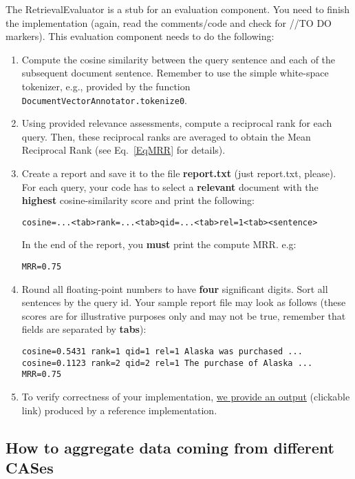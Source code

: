 \documentclass[oneside,11pt]{memoir}
\begin{document}
The RetrievalEvaluator is a stub for an evaluation component. 
You need to finish the implementation
(again, read the comments/code and check for //TO DO markers).
This evaluation component needs to do the following:
\begin{enumerate}
\item Compute the cosine similarity between the query sentence and each of the subsequent
document sentence. Remember to use the
simple white-space tokenizer, e.g.,
provided by the function \texttt{DocumentVectorAnnotator.tokenize0}.
\item Using provided relevance assessments, compute a reciprocal rank for each query.
Then, these reciprocal ranks are averaged to obtain the Mean Reciprocal Rank (see Eq.~\ref{EqMRR} for details).
\item Create a report and save it to the file \textbf{report.txt} (just report.txt, please). 
For each query, your code has to select a \textbf{relevant} document with the
\textbf{highest} cosine-similarity score and print the following:
\begin{verbatim}
cosine=...<tab>rank=...<tab>qid=...<tab>rel=1<tab><sentence>
\end{verbatim}
In the end of the report, you \textbf{must} print the compute MRR. e.g:
\begin{verbatim}
MRR=0.75
\end{verbatim}
\item Round all floating-point numbers to have \textbf{four} significant digits.
Sort all sentences by the query id.
Your sample report file may look as follows (these scores are for illustrative purposes only 
and may not be true, remember that fields are separated by \textbf{tabs}):
\begin{verbatim}
cosine=0.5431 rank=1 qid=1 rel=1 Alaska was purchased ...
cosine=0.1123 rank=2 qid=2 rel=1 The purchase of Alaska ...
MRR=0.75
\end{verbatim}
\item To verify correctness of your implementation,
\href{https://raw.githubusercontent.com/amaiberg/software-engineering-preliminary/master/src/retrieval-error-analysis/sample_report1_5.txt}{we provide an output} (clickable link) produced
by a reference implementation.
\end{enumerate}

\begingroup
\renewcommand{\cleardoublepage}{}
\renewcommand{\clearpage}{}
\subsection{How to aggregate data coming from different CASes} 
\endgroup
\end{document}
